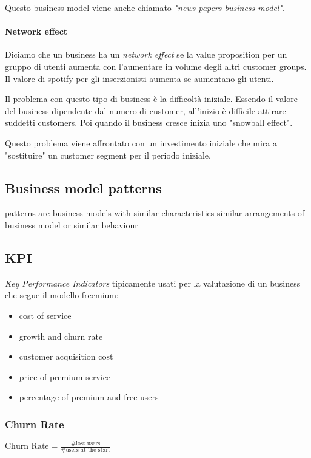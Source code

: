 \documentclass{article}
\begin{document}
Questo business model viene anche chiamato \textit{"news papers business model"}.

\paragraph{Network effect} Diciamo che un business ha un \textit{network effect} se la value proposition per un gruppo di utenti aumenta con l'aumentare in volume degli altri customer groups. Il valore di spotify per gli inserzionisti aumenta se aumentano gli utenti.

Il problema con questo tipo di business è la difficoltà iniziale. Essendo il valore del business dipendente dal numero di customer, all'inizio è difficile attirare suddetti customers. Poi quando il business cresce inizia uno "snowball effect".

Questo problema viene affrontato con un investimento iniziale che mira a "sostituire" un customer segment per il periodo iniziale.

\subsection{Business model patterns}
patterns are business models with similar characteristics similar arrangements of business model or similar behaviour

\subsection{KPI}
\textit{Key Performance Indicators} tipicamente usati per la valutazione di un business che segue il modello freemium:
\begin{itemize}
    \item cost of service
    \item growth and churn rate
    \item customer acquisition cost
    \item price of premium service
    \item percentage of premium and free users
\end{itemize}

\subsubsection{Churn Rate}
$\text{Churn Rate} = \frac{\#\text{lost users}}{\#\text{users at the start}}$
\end{document}

